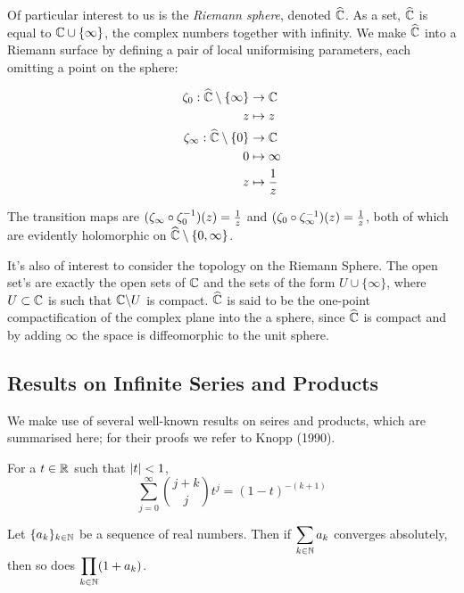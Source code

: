 Of particular interest to us is the \emph{Riemann sphere}, denoted $\widehat{\mathbb{C}}$. As a set, $\widehat{\mathbb{C}}$ is equal to $\mathbb{C} \cup \{\infty\}$, the complex numbers together with infinity. We make $\widehat{\mathbb{C}}$ into a Riemann surface by defining a pair of local uniformising parameters, each omitting a point on the sphere:

\begin{align*}
\zeta_0 : \widehat{\mathbb{C}}\setminus\{\infty\} &\to \mathbb{C}\\
z &\mapsto z\\
\zeta_\infty : \widehat{\mathbb{C}}\setminus\{0\} &\to \mathbb{C}\\
0           &\mapsto \infty\\
z           &\mapsto \frac{1}{z}
\end{align*}

The transition maps are
$(\zeta_\infty \circ \zeta_0^{-1})(z) = \frac{1}{z}$ and
$(\zeta_0 \circ \zeta_\infty^{-1})(z) = \frac{1}{z}$, both of which are evidently holomorphic on $\widehat{\mathbb{C}}\setminus\{0, \infty\}$.

It's also of interest to consider the topology on the Riemann Sphere. The open set's are exactly the open sets of $\mathbb{C}$ and the sets of the form $U \cup \{\infty\}$, where $U \subset \mathbb{C}$ is such that $\mathbb{C} \backslash U$ is compact. $\widehat{\mathbb{C}}$ is said to be the one-point compactification of the complex plane into the a sphere, since $\widehat{\mathbb{C}}$ is compact and by adding $\infty$ the space is diffeomorphic to the unit sphere. 

\subsection{Results on Infinite Series and Products}

We make use of several well-known results on seires and products, which are summarised here; for their proofs we refer to Knopp (1990).

\begin{thm}\label{ax:thm:binomial}
For a $t \in \mathbb{R}$ such that $\left|t\right| < 1$,
\[
\sum_{j=0}^\infty {{j + k} \choose j} t^j = (1-t)^{-(k+1)}
\]
\end{thm}

\begin{thm}\label{ax:thm:product}
Let $\{a_k\}_{k \in \mathbb{N}}$ be a sequence of real numbers. Then if $\displaystyle \sum_{k \in \mathbb{N}} a_k$ converges absolutely, then so does
$\displaystyle \prod_{k\in \mathbb{N}} (1+a_k)$.
\end{thm}

